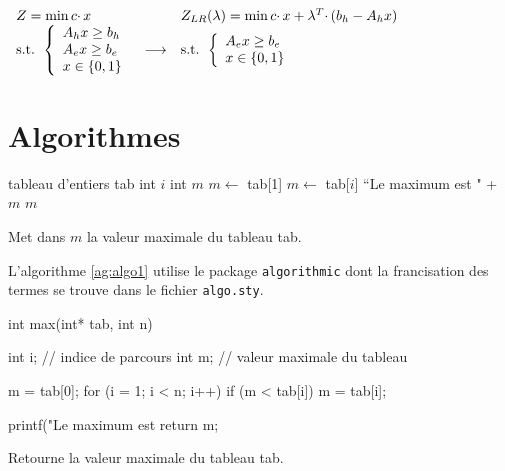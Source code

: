 \documentclass{rapport}
\begin{document}
      $\begin{array}{l c l}
        Z = \min c\cdotp x & & Z_{LR}(\lambda) = \min c\cdotp x + \lambda^T\cdotp(b_h - A_hx)\\
        \mbox{s.t. }
        \left\{
          \begin{array}{l}
            A_hx \geq b_h\\
            A_ex \geq b_e\\
            x \in \{0, 1\}
          \end{array}
        \right.
        & \longrightarrow
        & \mbox{s.t. }
        \left\{
          \begin{array}{l}
            A_ex \geq b_e\\
            x \in \{0, 1\}
          \end{array}
        \right.
      \end{array}$
      
      
    \section{Algorithmes}
        
      \begin{algorithm}
        \begin{algorithmic}
          \STATE tableau d'entiers tab 
          \STATE int $i$ 
          \STATE int $m$ 
          \STATE
          \STATE $m \leftarrow$ tab[1]
              \STATE $m \leftarrow$ tab[$i$]
            \ENDIF
            \STATE \PRINT ``Le maximum est " + $m$
            \RETURN $m$
          \ENDFOR
        \end{algorithmic}
        \caption[Algorithme 1 (nom dans la liste des algorithmes)]{Met dans $m$ la valeur maximale du tableau tab.\label{ag:algo1}}
      \end{algorithm}
      
      L'algorithme \ref{ag:algo1} utilise le package \verb|algorithmic| dont la francisation des termes se trouve dans le fichier \verb+algo.sty+.
      
      \begin{algorithm}
        \begin{C}
int max(int* tab, int n) {
  int i; // indice de parcours
  int m; // valeur maximale du tableau
  
  m = tab[0];
  for (i = 1; i < n; i++) {
    if (m < tab[i]) {
      m = tab[i];
    }
  }
  
  printf("Le maximum est %
  return m;
}
        \end{C}
        \caption[Algo en C]{Retourne la valeur maximale du tableau tab.\label{ag:algoc}}
      \end{algorithm}
      
\end{document}
